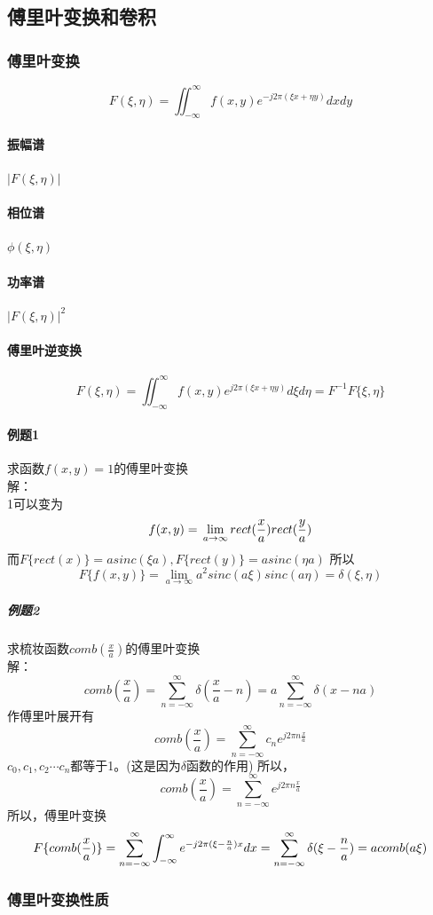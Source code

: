 \documentclass[UTF8]{ctexart}
\newcommand{\f}[2]{\frac{#1}{#2}}%
\newcommand{\sumsum}[3]{\sum_{#1=#2}^#3}
\begin{document}
\subsection{傅里叶变换和卷积}%
\subsubsection{傅里叶变换}
\[F(\xi,\eta)=\iint_{-\infty}^{\infty}f(x,y)e^{-j2\pi(\xi x+\eta y)}dxdy\]
\paragraph{振幅谱}$|F(\xi,\eta)|$
\paragraph{相位谱}$\phi(\xi,\eta)$
\paragraph{功率谱}$|F(\xi,\eta)|^2$
\paragraph{傅里叶逆变换}\[F(\xi,\eta)=\iint_{-\infty}^{\infty}f(x,y)e^{j2\pi(\xi x+\eta y)}d\xi d\eta=F^{-1} {F\{\xi,\eta\}}\]
\paragraph{例题1}求函数$f(x,y)=1$的傅里叶变换\\解：\\
1可以变为\[f(x,y)=\\
\lim\limits_{a \to \infty}rect(\f{x}{a})rect(\f{y}{a})\]
而$F\{rect(x)\}=asinc(\xi a),F\{rect(y)\}=asinc(\eta a)$
所以\[ F\{f(x,y)\}=\lim\limits_{a \to \infty}a^2sinc(a\xi)sinc(a\eta)=\delta(\xi,\eta)
\]
\subparagraph{例题2}求梳妆函数$comb(\f{x}{a})$的傅里叶变换
\\解：\[comb(\f{x}{a})=\sumsum{n}{-\infty}{\infty}\delta(\f{x}{a}-n)=a\sumsum{n}{-\infty}{\infty}\delta(x-na)\]
作傅里叶展开有\[
   comb(\f{x}{a})=\sumsum{n}{-\infty}{\infty}c_{n}e^{j2\pi n\f{x}{a}} \]
$c_{0},c_{1},c_{2}\cdots c_{n}$都等于1。(这是因为$\delta$函数的作用)
所以，\[
    comb(\f{x}{a})=\sumsum{n}{-\infty}{\infty}e^{j2\pi n\f{x}{a}}\]
所以，傅里叶变换\[
    F\{comb(\f{x}{a})\}=\sumsum{n}{-\infty}{\infty}\int_{-\infty}^{\infty}e^{-j2\pi(\xi-\f{n}{a})x}dx \\
    =\sumsum{n}{-\infty}{\infty}\delta(\xi-\f{n}{a})=acomb(a\xi)
    \]
\subsubsection{傅里叶变换性质}%
\end{document}
